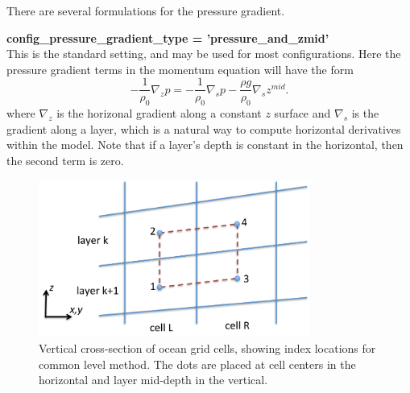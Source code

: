 There are several formulations for the pressure gradient.
 
{\bf \large config\_pressure\_gradient\_type = 'pressure\_and\_zmid'}\\
This is the standard setting, and may be used for most configurations.  Here the pressure gradient terms in the momentum equation will have the form
\begin{equation}
\label{ocean:grad p}
- \frac{1}{\rho_0}\nabla_z p = - \frac{1}{\rho_0}\nabla_s p - \frac{\rho g}{\rho_0}\nabla_s z^{mid}.
\end{equation}
where $\nabla_z$ is the horizonal gradient along a constant $z$ surface and $\nabla_s$ is the gradient along a layer, which is a natural way to compute horizontal derivatives within the model.  Note that if a layer's depth is constant in the horizontal, then the second term is zero.

\begin{figure}[htb]
\centering
\includegraphics[width=3.5in]{ocean/figures/common_level.pdf}
\caption{Vertical cross-section of ocean grid cells, showing index locations for common level method.  The dots are placed at cell centers in the horizontal and layer mid-depth in the vertical.}
\label{oceanFigure:common level}
\end{figure}

